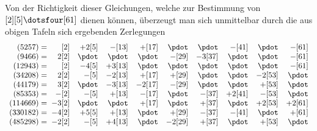 \par Von der Richtigkeit dieser Gleichungen, welche zur Bestimmung von $[2][5]\dotsfour[61]$ dienen können, überzeugt man sich unmittelbar durch die aus obigen Tafeln sich ergebenden Zerlegungen
\begingroup\fontsize{10}{13}\selectfont\setlength{\arraycolsep}{1.3pt}
\[
\begin{array}{r@{\;}rrrrrrrrr}
(5257)={} & [2] & +2[5] & -[13] & +[17] & \pdot & \pdot & -[41] & \pdot & -[61] \\
(9466)={} & 2[2] & \pdot & \pdot & \pdot & -[29] & -3[37] & \pdot & \pdot & -[61] \\
(12943)={} & [2] & -4[5] & +3[13] & \pdot & \pdot & \pdot & \pdot & \pdot & -[61] \\
(34208)={} & 2[2] & -[5] & -2[13] & +[17] & +[29] & \pdot & \pdot & -2[53] & \pdot \\
(44179)={} & 3[2] & \pdot & -3[13] & -2[17] & -[29] & \pdot & \pdot & +[53] & \pdot \\
(85353)={} & -[2] & -[5] & +[13] & -[17] & \pdot & -[37] & +2[41] & -[53] & \pdot \\
(114669)={} & -3[2] & \pdot & \pdot & +[17] & \pdot & +[37] & \pdot & +2[53] & +2[61] \\
(330182)={} & -4[2] & +5[5] & +[13] & \pdot & +[29] & -[37] & -[41] & \pdot & +[61] \\
(485298)={} & -2[2] & -[5] & +4[13] & \pdot & -2[29] & +[37] & \pdot & +[53] & \pdot \\
\end{array}
\]
\endgroup
